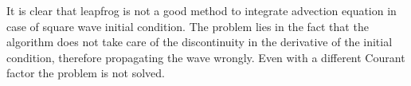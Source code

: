 \documentclass[11pt,a4paper]{article}
\begin{document}
\begin{figure}[!h]
\centering
{}
\end{figure}
It is clear that leapfrog is not a good method to integrate advection equation in case of square wave initial condition. The problem lies in the fact that the algorithm does not take care of the discontinuity in the derivative of the initial condition, therefore propagating the wave wrongly. Even with a different Courant factor the problem is not solved.
\end{document}
